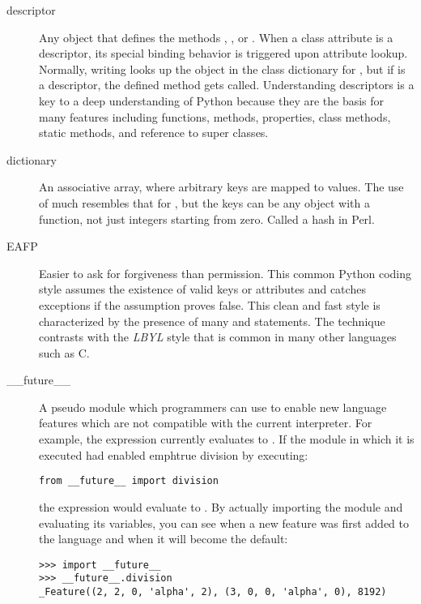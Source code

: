 \begin{description}
\item[descriptor]{Any object that defines the methods ,
, or .  When a class attribute is a
descriptor, its special binding behavior is triggered upon attribute lookup.
Normally, writing {} looks up the object  in the class
dictionary for , but if  is a descriptor, the defined method
gets called.  Understanding descriptors is a key to a deep understanding of
Python because they are the basis for many features including functions,
methods, properties, class methods, static methods, and reference to super
classes.}

\item[dictionary]{An associative array, where arbitrary keys are mapped to
values.  The use of  much resembles that for , but
the keys can be any object with a  function, not just
integers starting from zero.  Called a hash in Perl.}

\item[EAFP]{Easier to ask for forgiveness than permission.  This common
Python coding style assumes the existence of valid keys or attributes and
catches exceptions if the assumption proves false.  This clean and fast
style is characterized by the presence of many  and
{} statements.  The technique contrasts with the \emph{LBYL}
style that is common in many other languages such as C.}

\item[__future__]{A pseudo module which programmers can use to enable
new language features which are not compatible with the current interpreter.
For example, the expression  currently evaluates to .
If the module in which it is executed had enabled emph{true division} by
executing:}

\begin{verbatim}
from __future__ import division
\end{verbatim}

the expression  would evaluate to .  By actually
importing the  module and evaluating its variables, you
can see when a new feature was first added to the language and when it will
become the default:

\begin{verbatim}
>>> import __future__
>>> __future__.division
_Feature((2, 2, 0, 'alpha', 2), (3, 0, 0, 'alpha', 0), 8192)
\end{verbatim}


\end{description}

